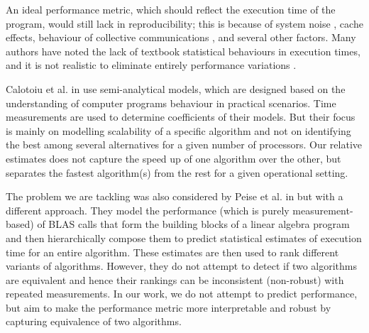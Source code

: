 \documentclass[conference]{IEEEtran}
\begin{document}
An ideal performance metric, which should reflect the execution time of the program, would still lack in reproducibility; this is because of system noise \cite{hoefler2010characterizing}, cache effects\cite{peise2014cache}, behaviour of
collective communications \cite{agarwal2005impact}, and several other factors. Many authors have noted the lack of
textbook statistical behaviours in execution times, and it is not realistic to eliminate entirely performance variations \cite{robustbenchmarking} \cite{trackingPerfVariation} \cite{statiscalperfCompare}. 

Calotoiu et al. in \cite{calotoiu2013} use semi-analytical models, which are designed based on the understanding of computer programs behaviour in practical scenarios. Time measurements are used to determine coefficients of their models. But their focus is mainly on modelling scalability of a specific algorithm and not on identifying the best among several alternatives for a given number of processors. Our relative estimates does not capture the speed up of one algorithm over the other, but separates the fastest algorithm(s) from the rest for a given operational setting.

The problem we are tackling was also considered by Peise et al. in \cite{peise2012performance} but with a different approach. They model the performance (which is purely measurement-based) of BLAS calls that form the building blocks of a linear algebra program and then hierarchically compose them to predict statistical estimates of execution time for an entire algorithm. These estimates are then used to rank different variants of algorithms. However, they do not attempt to detect if two algorithms are equivalent and hence their rankings can be inconsistent (non-robust) with repeated measurements. In our work, we do not attempt to predict performance, but aim to make the performance metric more interpretable  and robust by capturing equivalence of two algorithms.  
\end{document}
